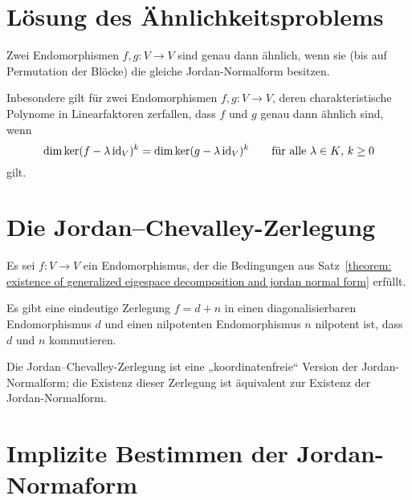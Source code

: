 




\section{Lösung des Ähnlichkeitsproblems}

\begin{theorem}
  Zwei Endomorphismen $f, g \colon V \to V$ sind genau dann ähnlich, wenn sie (bis auf Permutation der Blöcke) die gleiche Jordan-Normalform besitzen.
\end{theorem}

Inbesondere gilt für zwei Endomorphismen $f, g \colon V \to V$, deren charakteristische Polynome in Linearfaktoren zerfallen, dass $f$ und $g$ genau dann ähnlich sind, wenn
\[
    \dim \ker (f - \lambda \operatorname{id}_V)^k
  = \dim \ker (g - \lambda \operatorname{id}_V)^k
  \qquad
  \text{für alle $\lambda \in K$, $k \geq 0$}
\]
gilt.







\section{Die Jordan--Chevalley-Zerlegung}

Es sei $f \colon V \to V$ ein Endomorphismus, der die Bedingungen aus Satz~\ref{theorem: existence of generalized eigespace decomposition and jordan normal form} erfüllt.

\begin{proposition}
  Es gibt eine eindeutige Zerlegung $f = d + n$ in einen diagonalisierbaren Endomorphismus $d$ und einen nilpotenten Endomorphismus $n$ nilpotent ist, dass $d$ und $n$ kommutieren.
\end{proposition}

Die Jordan--Chevalley-Zerlegung ist eine „koordinatenfreie“ Version der Jordan-Normalform;
die Existenz dieser Zerlegung ist äquivalent zur Existenz der Jordan-Normalform.





\section{Implizite Bestimmen der Jordan-Normaform}

